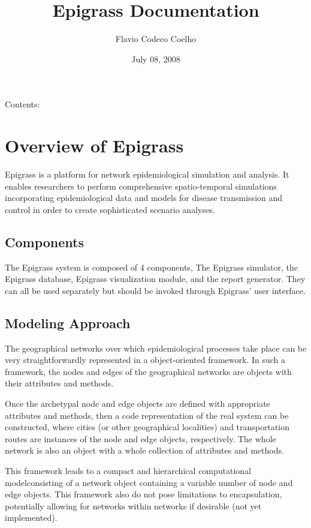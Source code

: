 \documentclass[a4paper,10pt]{manual}
\title{Epigrass Documentation}
\date{July 08, 2008}
\author{Flavio Codeco Coelho}
\begin{document}
\maketitle
\tableofcontents



Contents:

\resetcurrentobjects


\chapter{Overview of Epigrass}

Epigrass is a platform for network epidemiological simulation and analysis. It enables researchers to perform comprehensive spatio-temporal simulations incorporating epidemiological data and models for disease transmission and control in order to create sophisticated scenario analyses.


\section{Components}

The Epigrass system is composed of 4 components, The Epigrass simulator, the Epigrass database, Epigrass visualization module, and the report generator. They can all be used separately but should be invoked through Epigrass' user interface.


\section{Modeling Approach}

The geographical networks  over which epidemiological processes take place can be very straightforwardly represented in a object-oriented framework. In such a framework, the nodes and edges of the geographical networks are objects with their attributes and methods.

Once the archetypal node and edge objects are defined with appropriate attributes and methods, then a code representation of the real system can be constructed, where cities (or other geographical localities) and transportation routes are instances of the node and edge objects, respectively. The whole network is also an object with a whole collection of attributes and methods.

This framework leads to a compact and hierarchical computational modelconsisting of a network object containing a variable number of node and edge objects. This framework also do not pose limitations to encapsulation, potentially allowing for networks within networks if desirable (not yet implemented).
\end{document}
